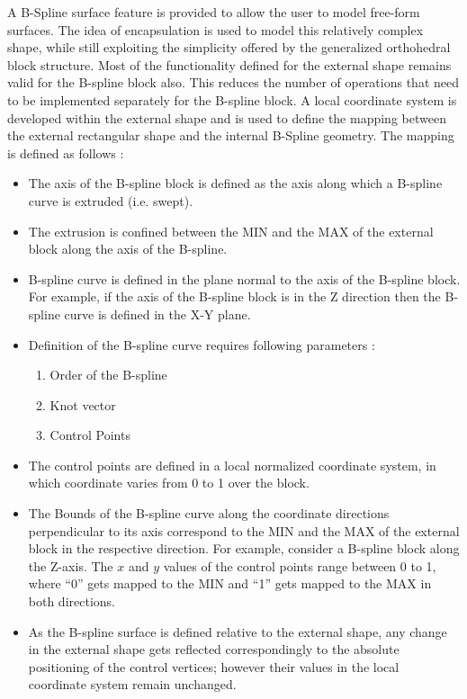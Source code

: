 	A B-Spline surface feature is provided to allow the user to model 
	free-form surfaces.
	The idea of encapsulation is used to model this relatively complex shape,
	while still exploiting the simplicity offered by the generalized orthohedral
	block structure. Most of the functionality defined for the external shape
	remains valid for the B-spline block also. This reduces the number of 
	operations that need to be implemented separately for the B-spline block.
	A local coordinate system is
	developed within the external shape and is used to define the mapping 
	between the external rectangular shape
	and the internal B-Spline geometry. The mapping is defined as follows :
		\begin{itemize}
		\item
		The
		axis of the B-spline block is defined as the axis along which a B-spline
		curve is extruded (i.e. swept). 
		\item
		The extrusion is confined between the 
		MIN and the MAX of the external block along the axis of the B-spline.
		\item
		B-spline curve is defined in the plane normal to the axis of the
		B-spline block. For example, if the axis of the B-spline block is
		in the Z direction then the B-spline curve is defined in the X-Y plane.
		\item
		Definition of the B-spline curve	requires following parameters :

            \begin{enumerate}
            \item
            Order of the B-spline
            \item
            Knot vector
            \item
            Control Points
            \end{enumerate}

		\item
		The control points are defined in a local normalized coordinate system, 		in which coordinate varies from 0 to 1 over the block.

		\item
		The Bounds of the B-spline curve along the coordinate directions
		perpendicular to its axis correspond to the MIN and
		the MAX of the external block in the respective direction. For example,
		consider a B-spline block along the Z-axis. The $x$ and $y$ values 
		of the control points range between 0 to 1, where ``0'' gets mapped to 
		the MIN and ``1'' gets mapped to the MAX in both directions.

		\item
		As the B-spline surface is defined relative to the external shape, any
		change in the external shape gets reflected correspondingly to the
		absolute positioning of the control vertices; however their values in
		the local coordinate system remain unchanged.

		\end{itemize}

